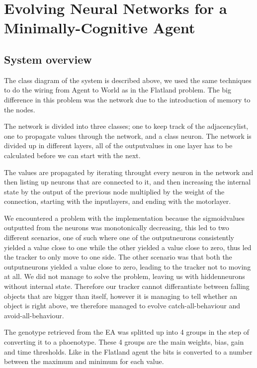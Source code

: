 \section{Evolving Neural Networks for a Minimally-Cognitive Agent}
\subsection{System overview}
The class diagram of the system is described above, we used the same techniques to do the wiring from Agent to World as in the Flatland problem. The big difference in this problem was the network due to the introduction of memory to the nodes.

The network is divided into three classes; one to keep track of the adjacencylist, one to propagate values through the network, and a class neuron. The network is divided up in different layers, all of the outputvalues in one layer has to be calculated before we can start with the next.

The values are propagated by iterating throught every neuron in the network and then listing up neurons that are connected to it, and then increasing the internal state by the output of the previous node multiplied by the weight of the connection, starting with the inputlayers, and ending with the motorlayer. 

We encountered a problem with the implementation because the sigmoidvalues outputted from the neurons was monotonically decreasing, this led to two different scenarios, one of such where one of the outputneurons consistently yielded a value close to one while the other yielded a value close to zero, thus led the tracker to only move to one side. The other scenario was that both the outputneurons yielded a value close to zero, leading to the tracker not to moving at all. We did not manage to solve the problem, leaving us with hiddenneurons without internal state. Therefore our tracker cannot differantiate between falling objects that are bigger than itself, however it is managing to tell whether an object is right above, we therefore managed to evolve catch-all-behaviour and avoid-all-behaviour. 



The genotype retrieved from the EA was splitted up into 4 groups in the step of converting it to a phoenotype. These 4 groups are the main weights, bias, gain and time thresholds. Like in the Flatland agent the bits is converted to a number between the maximum and minimum for each value.


